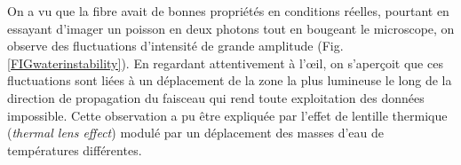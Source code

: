 
On a vu que la fibre avait de bonnes propriétés en conditions réelles, pourtant en essayant d'imager un poisson en deux photons tout en bougeant le microscope, on observe des fluctuations d'intensité de grande amplitude (Fig. \ref{FIGwaterinstability}). En regardant attentivement à l'œil, on s'aperçoit que ces fluctuations sont liées à un déplacement de la zone la plus lumineuse le long de la direction de propagation du faisceau qui rend toute exploitation des données impossible. Cette observation a pu être expliquée par l'effet de lentille thermique (\emph{thermal lens effect}) modulé par un déplacement des masses d'eau de températures différentes.

